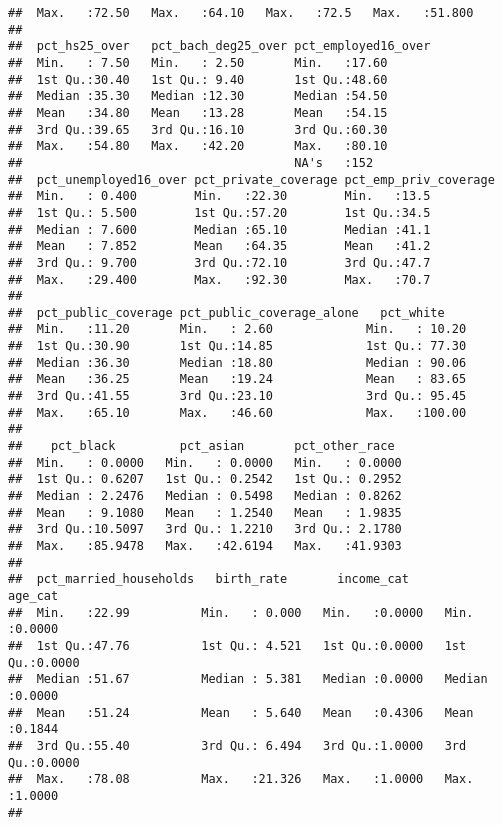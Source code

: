 \documentclass[]{article}
\begin{document}
\begin{verbatim}
##  Max.   :72.50   Max.   :64.10   Max.   :72.5   Max.   :51.800   
##                                                                  
##  pct_hs25_over   pct_bach_deg25_over pct_employed16_over
##  Min.   : 7.50   Min.   : 2.50       Min.   :17.60      
##  1st Qu.:30.40   1st Qu.: 9.40       1st Qu.:48.60      
##  Median :35.30   Median :12.30       Median :54.50      
##  Mean   :34.80   Mean   :13.28       Mean   :54.15      
##  3rd Qu.:39.65   3rd Qu.:16.10       3rd Qu.:60.30      
##  Max.   :54.80   Max.   :42.20       Max.   :80.10      
##                                      NA's   :152        
##  pct_unemployed16_over pct_private_coverage pct_emp_priv_coverage
##  Min.   : 0.400        Min.   :22.30        Min.   :13.5         
##  1st Qu.: 5.500        1st Qu.:57.20        1st Qu.:34.5         
##  Median : 7.600        Median :65.10        Median :41.1         
##  Mean   : 7.852        Mean   :64.35        Mean   :41.2         
##  3rd Qu.: 9.700        3rd Qu.:72.10        3rd Qu.:47.7         
##  Max.   :29.400        Max.   :92.30        Max.   :70.7         
##                                                                  
##  pct_public_coverage pct_public_coverage_alone   pct_white     
##  Min.   :11.20       Min.   : 2.60             Min.   : 10.20  
##  1st Qu.:30.90       1st Qu.:14.85             1st Qu.: 77.30  
##  Median :36.30       Median :18.80             Median : 90.06  
##  Mean   :36.25       Mean   :19.24             Mean   : 83.65  
##  3rd Qu.:41.55       3rd Qu.:23.10             3rd Qu.: 95.45  
##  Max.   :65.10       Max.   :46.60             Max.   :100.00  
##                                                                
##    pct_black         pct_asian       pct_other_race   
##  Min.   : 0.0000   Min.   : 0.0000   Min.   : 0.0000  
##  1st Qu.: 0.6207   1st Qu.: 0.2542   1st Qu.: 0.2952  
##  Median : 2.2476   Median : 0.5498   Median : 0.8262  
##  Mean   : 9.1080   Mean   : 1.2540   Mean   : 1.9835  
##  3rd Qu.:10.5097   3rd Qu.: 1.2210   3rd Qu.: 2.1780  
##  Max.   :85.9478   Max.   :42.6194   Max.   :41.9303  
##                                                       
##  pct_married_households   birth_rate       income_cat        age_cat      
##  Min.   :22.99          Min.   : 0.000   Min.   :0.0000   Min.   :0.0000  
##  1st Qu.:47.76          1st Qu.: 4.521   1st Qu.:0.0000   1st Qu.:0.0000  
##  Median :51.67          Median : 5.381   Median :0.0000   Median :0.0000  
##  Mean   :51.24          Mean   : 5.640   Mean   :0.4306   Mean   :0.1844  
##  3rd Qu.:55.40          3rd Qu.: 6.494   3rd Qu.:1.0000   3rd Qu.:0.0000  
##  Max.   :78.08          Max.   :21.326   Max.   :1.0000   Max.   :1.0000  
## 
\end{verbatim}
\end{document}

